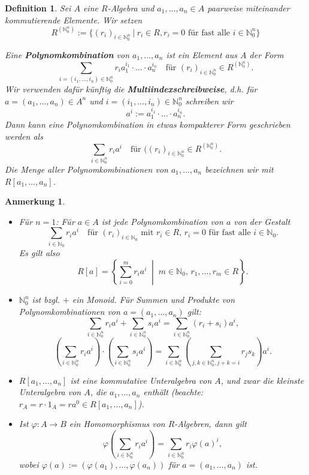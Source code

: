 \documentclass[a4paper, twoside, 11pt, ngerman]{report}
\newcommand{\NN}{\mathds N}
\theoremstyle{definistyle}
\newtheorem{defini}[satz]{Definition}
\newtheorem{anm}[satz]{Anmerkung}
\theoremstyle{remark}
\newcommand{\defn}[1]{\textit{\bfseries #1}}
\begin{document}
\begin{defini}\label{def:polynomkombination}
Sei $A$ eine $R$-Algebra und $a_1, \dots, a_n \in A$ paarweise miteinander kommutierende Elemente. Wir setzen
\[
R^{(\NN_0^n)}:=\{ (r_i)_{i \in \NN_0^n} \ | \ r_i\in R, r_i=0 \text{ für fast alle }
i\in\NN_0^n\}
\]

Eine \defn{Polynomkombination} von $a_1, \dots, a_n$ ist ein Element aus $A$ der Form
\[
\sum_{i = (i_1, \dots, i_n) \in \NN_0^n} r_i a_1^{i_1} \cdot\ldots\cdot a_n^{i_n} \quad \text{für } (r_i)_{i \in \NN_0^n}\in R^{(\NN_0^n)}.
\]
Wir verwenden dafür künftig die \defn{Multiindexschreibweise}, d.h. für $a = (a_1, \dots, a_n) \in A^n$ und $i = (i_1, \dots, i_n) \in \NN_0^n$ schreiben wir
\[
a^i := a_1^{i_1} \cdot\ldots\cdot a_n^{i_n}.
\]
Dann kann eine Polynomkombination in etwas kompakterer Form geschrieben werden als
\[
\sum_{i \in \NN_0^n} r_i a^i \quad \text{für } ((r_i)_{i \in \NN_0^n}\in R^{(\NN_0^n)}.
\]
Die Menge aller Polynomkombinationen von $a_1, \dots, a_n$ bezeichnen wir mit $R[a_1, \dots, a_n]$.
\end{defini}

\begin{anm}\label{anm:poly_r_alg_kom}
\begin{itemize}
    \item Für $n = 1$: Für $a \in A$ ist jede Polynomkombination von $a$ von der Gestalt
    \[
    \sum_{i \in \NN_0} r_i a^i \quad \text{für } (r_i)_{i \in \NN_0} \text{ mit } r_i\in R , \, r_i = 0 \text{ für fast alle } i \in \NN_0.
    \]
    Es gilt also
    \[
    R[a] = \left\{ \sum_{i = 0}^m r_i a^i \;\middle|\; m \in \NN_0, \, r_1, \ldots, r_m \in R \right\}.
    \]
    \item $\NN_0^n$ ist bzgl. $+$ ein Monoid. Für Summen und Produkte von Polynomkombinationen von $a = (a_1, \ldots, a_n)$ gilt:
    \[
    \sum_{i \in \NN_0^n} r_i a^i + \sum_{i \in \NN_0^n} s_i a^i = \sum_{i \in \NN_0^n} (r_i + s_i) a^i,
    \]
    \[
    \left( \sum_{i \in \NN_0^n} r_i a^i \right) \cdot \left( \sum_{i \in \NN_0^n} s_i a^i \right) = \sum_{i \in \NN_0^n} \left( \sum_{j, k \in \NN_0^n, j + k = i} r_j s_k \right) a^i.
    \]
    \item $R[a_1, \ldots, a_n]$ ist eine kommutative Unteralgebra von $A$, und zwar die kleinste Unteralgebra von $A$, die $a_1, \ldots, a_n$ enthält (beachte:
    $r_A=r \cdot 1_A = r a^0 \in R[a_1, \ldots, a_n]$).
    \item Ist $\varphi: A \to B$ ein Homomorphismus von $R$-Algebren, dann gilt
    \[
    \varphi \left( \sum_{i \in \NN_0^n} r_i a^i \right) = \sum_{i \in \NN_0^n} r_i \varphi(a)^i,
    \]
    wobei $\varphi(a) := (\varphi(a_1), \ldots, \varphi(a_n))$ für $a=(a_1,\ldots,a_n)$ ist.
\end{itemize}
\end{anm}
\end{document}
